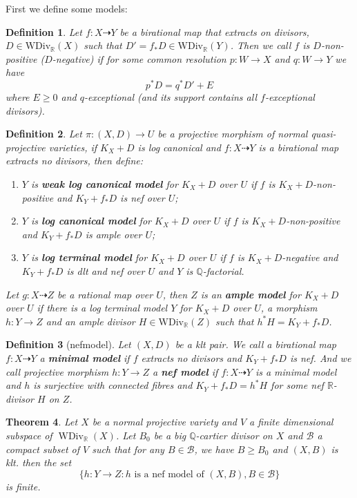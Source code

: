 \documentclass{article}
\newtheorem{defn}{Definition}[section]
\newtheorem{thm}[defn]{Theorem}
\begin{document}
First we define some models:
\begin{defn}
Let $ f:X\dashrightarrow Y$ be a birational map that extracts on divisors, $ D\in \mathrm{WDiv}_\mathbb{R}(X) $ such that $ D'=f_*D\in \mathrm{WDiv}_\mathbb{R}(Y) $. Then we call $ f $ is $ D $-non-positive ($ D $-negative) if for some common resolution $ p:W\to X $ and $ q:W\to Y $ we have
$$ p^*D=q^*D'+E $$
where $ E\geqslant 0 $ and $ q $-exceptional (and its support contains all $ f $-exceptional divisors).
\end{defn}

\begin{defn}
Let $ \pi:(X,D)\to U $ be a projective morphism of normal quasi-projective varieties, if $ K_X+D $ is log canonical and $ f:X\dashrightarrow Y $ is a birational map extracts no divisors, then define:
\begin{enumerate}
\item $ Y $ is \textbf{ weak log canonical model} for $ K_X+D $ over $ U $ if $ f $ is $ K_X+D $-non-positive and $ K_Y+f_*D $ is nef over $ U $;
\item $ Y $ is \textbf{ log canonical model} for $ K_X+D $ over $ U $ if $ f $ is $ K_X+D $-non-positive and $ K_Y+f_*D $ is ample over $ U $;
\item $ Y $ is \textbf{ log terminal model} for $ K_X+D $ over $ U $ if $ f $ is $ K_X+D $-negative and $ K_Y+f_*D $ is dlt and nef over $ U $ and $ Y $ is $ \mathbb{Q} $-factorial.
\end{enumerate}
Let $ g:X\dashrightarrow Z $ be a rational map over $ U $, then $ Z $ is an \textbf{ample model } for $ K_X+D $ over $ U $ if there is a log terminal model $ Y $ for $ K_X+D $ over $ U $, a morphism $ h:Y\to Z $ and an ample divisor $ H\in \mathrm{WDiv}_\mathbb{R}(Z) $ such that $ h^*H=K_Y+f_*D $.
\end{defn}

\begin{defn}[nefmodel]\label{nefmodel}
Let $ (X,D) $ be a klt pair. We call a birational map $f:X\dashrightarrow Y $ a \textbf{minimal model} if $f$ extracts no divisors and $K_{Y}+f_*D$ is nef. And we call  projective morphism  $  h:Y\to Z $ a \textbf{nef model} if $ f:X\dashrightarrow Y $ is a minimal model and $ h $ is surjective with connected fibres and $ K_Y+f_*D=h^*H $ for some nef $ \mathbb{R} $-divisor $ H $ on $ Z $.
\end{defn}
\begin{thm}\label{finitenefmodel}
Let $ X $ be a normal projective variety and $ V $ a finite dimensional subspace of $ \operatorname{WDiv}_\mathbb{R}(X) $. Let $ B_0 $ be a big $ \mathbb{Q}$-cartier divisor on $ X $ and $ \mathcal{B} $ a compact subset of $ V $ such that for any $ B\in \mathcal{B} $, we have $ B\geqslant B_0 $ and $ (X,B) $ is klt. then the set
\[ \{h:Y\to Z:  h \text{ is a nef model of } (X,B), B\in\mathcal{B} \} \]
is finite.
\end{thm}
\end{document}
